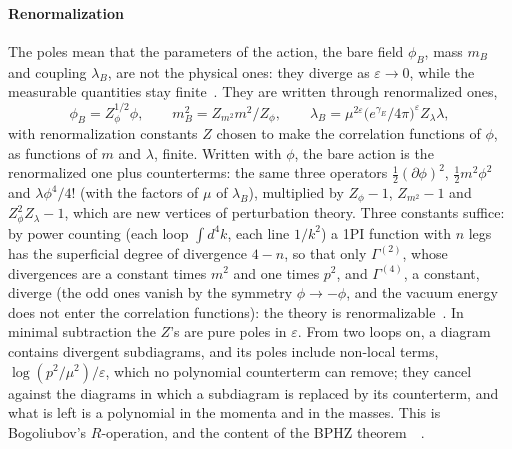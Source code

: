 \documentclass[11pt,a4paper]{article}
\begin{document}
\paragraph{Renormalization} The poles mean that the parameters of the action, the bare field $\phi_B$, mass $m_B$ and coupling
$\lambda_B$, are not the physical ones: they diverge as $\varepsilon\to0$, while the measurable quantities stay
finite~\cite[sections~10.1--10.2]{PeskinSchroeder}. They are written through renormalized ones,
\[
\phi_B=Z_\phi^{1/2}\phi,\qquad m_B^2=Z_{m^2}m^2/Z_\phi,\qquad
\lambda_B=\mu^{2\varepsilon}\bigl(e^{\gamma_E}/4\pi\bigr)^\varepsilon Z_\lambda\lambda ,
\]
with renormalization constants $Z$ chosen to make the correlation functions of $\phi$, as functions of $m$ and $\lambda$,
finite. Written with $\phi$, the bare action is the renormalized one plus counterterms: the same three operators
$\frac12(\partial\phi)^2$, $\frac12m^2\phi^2$ and $\lambda\phi^4/4!$ (with the factors of $\mu$ of $\lambda_B$), multiplied by
$Z_\phi-1$, $Z_{m^2}-1$ and $Z_\phi^2Z_\lambda-1$, which are new vertices of perturbation theory. Three constants suffice:
by power counting (each loop $\int d^4k$, each line $1/k^2$) a 1PI function with $n$ legs has the superficial degree of
divergence $4-n$, so that only $\Gamma^{(2)}$, whose divergences are a constant times $m^2$ and one times $p^2$, and $\Gamma^{(4)}$, a
constant, diverge (the odd ones vanish by the symmetry $\phi\to-\phi$, and the vacuum energy does not enter the correlation
functions): the theory is renormalizable~\cite{Collins1984,ZinnJustin2002,KleinertSchulteFrohlinde2001}. In minimal
subtraction the $Z$'s are pure poles in $\varepsilon$. From two loops on, a diagram contains divergent subdiagrams, and its
poles include non-local terms, $\log(p^2/\mu^2)/\varepsilon$, which no polynomial counterterm can remove; they cancel against
the diagrams in which a subdiagram is replaced by its counterterm, and what is left is a polynomial in the momenta and in
the masses. This is Bogoliubov's $R$-operation, and the content of the BPHZ
theorem~\cite[section~10.4]{PeskinSchroeder}~\cite{Collins1984}.
\end{document}
